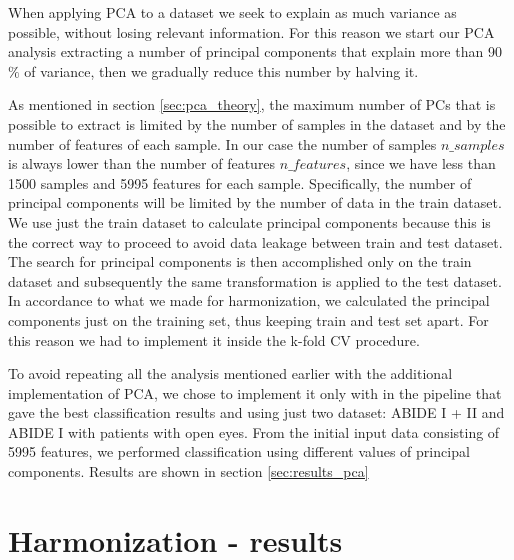 \documentclass[11pt]{report}
\begin{document}

When applying PCA to a dataset we seek to explain as much variance as possible, without losing relevant information.
For this reason we start our PCA analysis extracting a number of principal components that explain more than 90$\%$ of variance, then we gradually reduce this number by halving it.

As mentioned in section \ref{sec:pca_theory}, the maximum number of PCs  that is possible to extract is limited by the number of samples in the dataset and by the number of features of each sample.
In our case the number of samples $n\_samples$ is always lower than the number of features $n\_features$, since we have less than 1500 samples and 5995 features for each sample.
Specifically, the number of principal components will be limited by the number of data in the train dataset.
We use just the train dataset to calculate principal components because this is the correct way to proceed to avoid data leakage between train and test dataset.
The search for principal components is then accomplished only on the train dataset and subsequently the same transformation is applied to the test dataset.
In accordance to what we made for harmonization, we calculated the principal components just on the training set, thus keeping train and test set apart.
For this reason we had to implement it inside the k-fold CV procedure.


To avoid repeating all the analysis mentioned earlier with the additional implementation of PCA, we chose to implement it only with in the pipeline that gave the best classification results and using just two dataset: ABIDE I + II and ABIDE I with patients with open eyes.
From the initial input data consisting of 5995 features, we performed classification using different values of principal components.
Results are shown in section \ref{sec:results_pca}



\chapter{Harmonization - results}\label{chap:harmonization_results}
\end{document}
